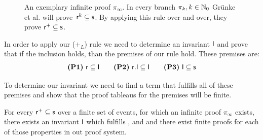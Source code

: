 \documentclass[a4paper,twoside,12pt, english]{article}
\begin{document}
\begin{figure}[H]
\begin{mathpar}
\end{mathpar}
\caption{An exemplary infinite proof $\pi_\infty$. In every branch $\pi_k, k \in \mathbb{N}_0$ Grünke et al. will prove~$\textsf{\upshape r}^k \subseteq \textsf{\upshape s}$. By applying this rule over and over, they prove $\textsf{\upshape r}^+ \subseteq \textsf{\upshape s}$.} \label{fig:infiniteproof}
\end{figure}

\noindent In order to apply our ($+_L$) rule we need to determine an invariant $\textsf{\upshape I}$ and prove that if the inclusion holds, than the premises of our rule hold.
These premises are: 
\[
\textbf{(P1)}~ \textsf{\upshape r} \subseteq \textsf{\upshape I} \qquad
\textbf{(P2)}~ \textsf{\upshape r}.\textsf{\upshape I} \subseteq \textsf{\upshape I} \qquad
\textbf{(P3)}~ \textsf{\upshape I} \subseteq \textsf{\upshape s}
\]

\noindent To determine our invariant we need to find a term that fulfills all of these premises and show that the proof tableaus for the premises will be finite.

\begin{lemma}For every $\textsf{\upshape r}^+ \subseteq \textsf{\upshape s}$ over a finite set of events, for which an infinite proof $\pi_\infty$ exists, there exists an invariant $\textsf{\upshape I}$ which fulfills \propl, \propz{} and \prope{} and there exist finite proofs for each of those properties in out proof system. \end{lemma}
\end{document}
